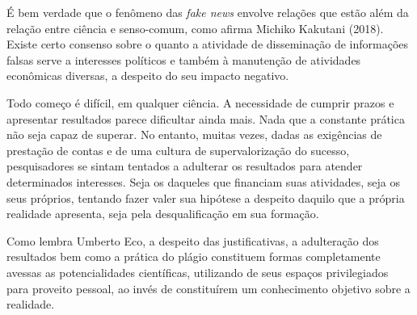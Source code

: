 É bem verdade que o fenômeno das \textit{fake news} envolve relações que estão além da relação entre ciência e senso-comum, como afirma Michiko Kakutani (2018). Existe certo consenso sobre o quanto a atividade de disseminação de informações falsas serve a interesses políticos e também à manutenção de atividades econômicas diversas, a despeito do seu impacto negativo.


Todo começo é difícil, em qualquer ciência. A necessidade de cumprir prazos e apresentar resultados parece dificultar ainda mais. Nada que a constante prática não seja capaz de superar. No entanto, muitas vezes, dadas as exigências de prestação de contas e de uma cultura de supervalorização do sucesso, pesquisadores se sintam tentados a adulterar os resultados para atender determinados interesses. Seja os daqueles que financiam suas atividades, seja os seus próprios, tentando fazer valer sua hipótese a despeito daquilo que a própria realidade apresenta, seja pela desqualificação em sua formação.

Como lembra Umberto Eco, a despeito das justificativas, a adulteração dos resultados bem como a prática do plágio constituem formas completamente avessas as potencialidades científicas, utilizando de seus espaços privilegiados para proveito pessoal, ao invés de constituírem um conhecimento objetivo sobre a realidade.

